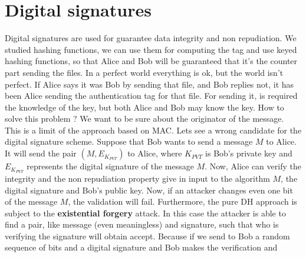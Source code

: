 \documentclass[11pt]{article}
\begin{document}
\section{Digital signatures}
Digital signatures are used for guarantee data integrity and non repudiation. We studied hashing functions, we can use them for computing the tag and use keyed hashing functions, so that Alice and Bob will be guaranteed that it's the counter part sending the files. In a perfect world everything is ok, but the world isn't perfect. If Alice says it was Bob by sending that file, and Bob replies not, it has been Alice sending the authentication tag for that file. For sending it, is required the knowledge of the key, but both Alice and Bob may know the key. How to solve this problem ? We want to be sure about the originator of the message. This is a limit of the approach based on MAC. Lets see a wrong candidate for the digital signature scheme. Suppose that Bob wants to send a message $M$ to Alice. It will send the pair $(M, E_{K_{PVT}})$ to Alice, where $K_{PVT}$ is Bob's private key and $E_{K_{PVT}}$ represents the digital signature of the message $M$. Now, Alice can verify the integrity and the non repudiation property give in input to the algorithm $M$, the digital signature and Bob's public key. Now, if an attacker changes even one bit of the message $M$, the validation will fail. Furthermore, the pure DH approach is subject to the \textbf{existential forgery} attack. In this case the attacker is able to find a pair, like message (even meaningless) and signature, such that who is verifying the signature will obtain accept. Because if we send to Bob a random sequence of bits and a digital signature and Bob makes the verification and
\end{document}
